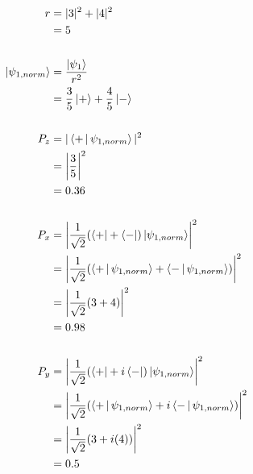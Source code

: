 \documentclass[12pt]{article}
\begin{document}
    \begin{align*}
        r &= |3|^2 + |4|^2 \\
            &= 5 \\
        \\ 
        \Ket{\psi_{1,norm}} &= \frac{\Ket{\psi_1}}{r^2} \\
                             &= \frac{3}{5}\Ket{+} + \frac{4}{5}\Ket{-} \\
        \\
        P_z &= |\Braket{+|\psi_{1,norm}}|^2 \\
            &= \left|\frac{3}{5}\right|^2 \\
            &= 0.36 \\
        \\
        P_x &= \left|\frac{1}{\sqrt{2}}
            (\Bra{+} + \Bra{-})\Ket{\psi_{1,norm}}\right|^2 \\
            &= \left|\frac{1}{\sqrt{2}}
            (\Braket{+|\psi_{1,norm}} + \Braket{-|\psi_{1,norm}})\right|^2 \\
            &= \left|\frac{1}{\sqrt{2}} (3 + 4)\right|^2 \\
            &= 0.98 \\
        \\
        P_y &= \left|\frac{1}{\sqrt{2}}
            (\Bra{+} + i\Bra{-})\Ket{\psi_{1,norm}}\right|^2 \\
            &= \left|\frac{1}{\sqrt{2}}
            (\Braket{+|\psi_{1,norm}} + i\Braket{-|\psi_{1,norm}})\right|^2 \\
            &= \left|\frac{1}{\sqrt{2}} (3 + i(4))\right|^2 \\
            &= 0.5
    \end{align*}


    
    
    \problemsub
    
\end{document}
